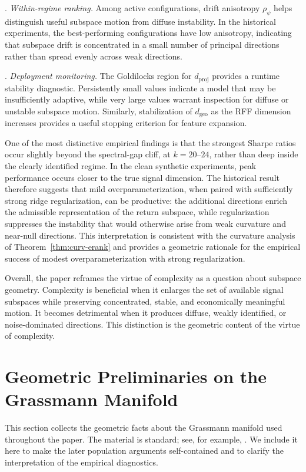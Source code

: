 \documentclass[11pt,letterpaper]{article}
\begin{document}
\smallskip{}. \textit{Within-regime ranking.} Among active configurations, drift anisotropy $\rho_\psi$ helps distinguish useful subspace motion from diffuse instability. In the historical experiments, the best-performing configurations have low anisotropy, indicating that subspace drift is concentrated in a small number of principal directions rather than spread evenly across weak directions.

\smallskip{}. \textit{Deployment monitoring.} The Goldilocks region for $d_{\mathrm{proj}}$ provides a runtime stability diagnostic. Persistently small values indicate a model that may be insufficiently adaptive, while very large values warrant inspection for diffuse or unstable subspace motion. Similarly, stabilization of $d_{\mathrm{geo}}$ as the RFF dimension increases provides a useful stopping criterion for feature expansion.

One of the most distinctive empirical findings is that the strongest Sharpe ratios occur slightly beyond the spectral-gap cliff, at $k=20$--$24$, rather than deep inside the clearly identified regime. In the clean synthetic experiments, peak performance occurs closer to the true signal dimension. The historical result therefore suggests that mild overparameterization, when paired with sufficiently strong ridge regularization, can be productive: the additional directions enrich the admissible representation of the return subspace, while regularization suppresses the instability that would otherwise arise from weak curvature and near-null directions. This interpretation is consistent with the curvature analysis of Theorem~\ref{thm:curv-erank} and provides a geometric rationale for the empirical success of modest overparameterization with strong regularization.

Overall, the paper reframes the virtue of complexity as a question about subspace geometry. Complexity is beneficial when it enlarges the set of available signal subspaces while preserving concentrated, stable, and economically meaningful motion. It becomes detrimental when it produces diffuse, weakly identified, or noise-dominated directions. This distinction is the geometric content of the virtue of complexity.


\appendix
\section{Geometric Preliminaries on the Grassmann Manifold}
\label{sec:grass_geom}

This section collects the geometric facts about the Grassmann manifold used throughout the paper. The material is standard; see, for example, \cite{AMS08,BZA24}. We include it here to make the later population arguments self-contained and to clarify the interpretation of the empirical diagnostics.
\end{document}
